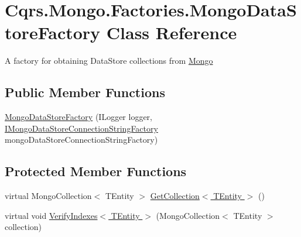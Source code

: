 \hypertarget{classCqrs_1_1Mongo_1_1Factories_1_1MongoDataStoreFactory}{}\section{Cqrs.\+Mongo.\+Factories.\+Mongo\+Data\+Store\+Factory Class Reference}
\label{classCqrs_1_1Mongo_1_1Factories_1_1MongoDataStoreFactory}


A factory for obtaining Data\+Store collections from \hyperlink{namespaceCqrs_1_1Mongo}{Mongo}  


\subsection*{Public Member Functions}
\begin{DoxyCompactItemize}
\item 
\hyperlink{classCqrs_1_1Mongo_1_1Factories_1_1MongoDataStoreFactory_a13e1957d50ef5ebb18723a3628a0ae5d_a13e1957d50ef5ebb18723a3628a0ae5d}{Mongo\+Data\+Store\+Factory} (I\+Logger logger, \hyperlink{interfaceCqrs_1_1Mongo_1_1Factories_1_1IMongoDataStoreConnectionStringFactory}{I\+Mongo\+Data\+Store\+Connection\+String\+Factory} mongo\+Data\+Store\+Connection\+String\+Factory)
\end{DoxyCompactItemize}
\subsection*{Protected Member Functions}
\begin{DoxyCompactItemize}
\item 
virtual Mongo\+Collection$<$ T\+Entity $>$ \hyperlink{classCqrs_1_1Mongo_1_1Factories_1_1MongoDataStoreFactory_a4785651135b3a214a855b4d1f7700836_a4785651135b3a214a855b4d1f7700836}{Get\+Collection$<$ T\+Entity $>$} ()
\item 
virtual void \hyperlink{classCqrs_1_1Mongo_1_1Factories_1_1MongoDataStoreFactory_af7db637db99701003e3d8f73a83a3485_af7db637db99701003e3d8f73a83a3485}{Verify\+Indexes$<$ T\+Entity $>$} (Mongo\+Collection$<$ T\+Entity $>$ collection)
\end{DoxyCompactItemize}

